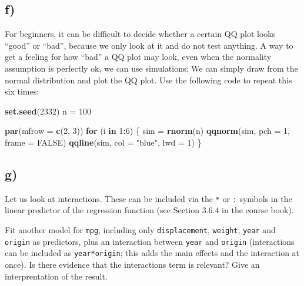 \documentclass[]{article}
\newenvironment{Shaded}{\begin{snugshade}}{\end{snugshade}}
\newcommand{\ControlFlowTok}[1]{\textcolor[rgb]{0.13,0.29,0.53}{\textbf{#1}}}
\newcommand{\DataTypeTok}[1]{\textcolor[rgb]{0.13,0.29,0.53}{#1}}
\newcommand{\DecValTok}[1]{\textcolor[rgb]{0.00,0.00,0.81}{#1}}
\newcommand{\KeywordTok}[1]{\textcolor[rgb]{0.13,0.29,0.53}{\textbf{#1}}}
\newcommand{\NormalTok}[1]{#1}
\newcommand{\OperatorTok}[1]{\textcolor[rgb]{0.81,0.36,0.00}{\textbf{#1}}}
\newcommand{\OtherTok}[1]{\textcolor[rgb]{0.56,0.35,0.01}{#1}}
\newcommand{\StringTok}[1]{\textcolor[rgb]{0.31,0.60,0.02}{#1}}
\begin{document}
\hypertarget{f}{%
\subsection{f)}\label{f}}

For beginners, it can be difficult to decide whether a certain QQ plot
looks ``good'' or ``bad'', because we only look at it and do not test
anything. A way to get a feeling for how ``bad'' a QQ plot may look,
even when the normality assumption is perfectly ok, we can use
simulations: We can simply draw from the normal distribution and plot
the QQ plot. Use the following code to repeat this six times:

\begin{Shaded}
\begin{Highlighting}[]
\KeywordTok{set.seed}\NormalTok{(}\DecValTok{2332}\NormalTok{)}
\NormalTok{n =}\StringTok{ }\DecValTok{100}

\KeywordTok{par}\NormalTok{(}\DataTypeTok{mfrow =} \KeywordTok{c}\NormalTok{(}\DecValTok{2}\NormalTok{, }\DecValTok{3}\NormalTok{))}
\ControlFlowTok{for}\NormalTok{ (i }\ControlFlowTok{in} \DecValTok{1}\OperatorTok{:}\DecValTok{6}\NormalTok{) \{}
\NormalTok{    sim =}\StringTok{ }\KeywordTok{rnorm}\NormalTok{(n)}
    \KeywordTok{qqnorm}\NormalTok{(sim, }\DataTypeTok{pch =} \DecValTok{1}\NormalTok{, }\DataTypeTok{frame =} \OtherTok{FALSE}\NormalTok{)}
    \KeywordTok{qqline}\NormalTok{(sim, }\DataTypeTok{col =} \StringTok{"blue"}\NormalTok{, }\DataTypeTok{lwd =} \DecValTok{1}\NormalTok{)}
\NormalTok{\}}
\end{Highlighting}
\end{Shaded}

\hypertarget{g}{%
\subsection{g)}\label{g}}

Let us look at interactions. These can be included via the \texttt{*} or
\texttt{:} symbols in the linear predictor of the regression function
(see Section 3.6.4 in the course book).

Fit another model for \texttt{mpg}, including only
\texttt{displacement}, \texttt{weight}, \texttt{year} and
\texttt{origin} as predictors, plus an interaction between \texttt{year}
and \texttt{origin} (interactions can be included as
\texttt{year*origin}; this adds the main effects and the interaction at
once). Is there evidence that the interactions term is relevant? Give an
interprentation of the result.
\end{document}
